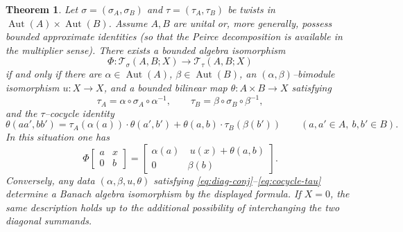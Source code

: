 \documentclass{article}
\theoremstyle{plain}
\newtheorem{theorem}{Theorem}[section]
\theoremstyle{definition}
\newcommand{\T}{\mathcal{T}}
\newcommand{\Aut}{\operatorname{Aut}}
\begin{document}
\begin{theorem}\label{thm:iso}
Let \(\sigma=(\sigma_A,\sigma_B)\) and \(\tau=(\tau_A,\tau_B)\) be twists in \(\Aut(A)\times\Aut(B)\).
Assume \(A,B\) are unital or, more generally, possess bounded approximate identities (so that the Peirce decomposition is available in the multiplier sense).
There exists a bounded algebra isomorphism
\[
\Phi:\T_\sigma(A,B;X)\longrightarrow \T_\tau(A,B;X)
\]
if and only if there are \(\alpha\in\Aut(A)\), \(\beta\in\Aut(B)\), an \((\alpha,\beta)\)--bimodule isomorphism \(u:X\to X\), and a bounded bilinear map \(\theta:A\times B\to X\) satisfying
\begin{equation}\label{eq:diag-conj}
\tau_A=\alpha\circ \sigma_A\circ \alpha^{-1},
\qquad
\tau_B=\beta\circ \sigma_B\circ \beta^{-1},
\end{equation}
and the \(\tau\)--cocycle identity
\begin{equation}\label{eq:cocycle-tau}
\theta(aa',bb')=\tau_A(\alpha(a))\cdot \theta(a',b')+\theta(a,b)\cdot \tau_B(\beta(b'))
\qquad(a,a'\in A,\ b,b'\in B).
\end{equation}
In this situation one has
\[
\Phi\!\begin{bmatrix}a&x\\[2pt]0&b\end{bmatrix}
=
\begin{bmatrix}\alpha(a)&\ u(x)+\theta(a,b)\\[2pt]0&\beta(b)\end{bmatrix}.
\]
Conversely, any data \((\alpha,\beta,u,\theta)\) satisfying \eqref{eq:diag-conj}--\eqref{eq:cocycle-tau} determine a Banach algebra isomorphism by the displayed formula.
If \(X=0\), the same description holds up to the additional possibility of interchanging the two diagonal summands.
\end{theorem}
\end{document}

